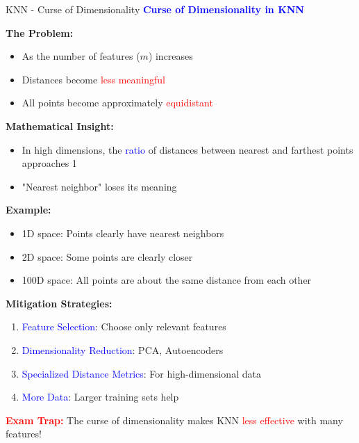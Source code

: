 \documentclass[8pt]{beamer}
\begin{document}
	\begin{frame}{KNN - Curse of Dimensionality}
		\fontsize{6.5}{7.5}\selectfont
		\textcolor{blue}{\textbf{Curse of Dimensionality in KNN}}
		
		\textbf{The Problem:}
		\begin{itemize}
			\item As the number of features ($m$) increases
			\item Distances become \textcolor{red}{less meaningful}
			\item All points become approximately \textcolor{red}{equidistant}
		\end{itemize}
		
		\textbf{Mathematical Insight:}
		\begin{itemize}
			\item In high dimensions, the \textcolor{blue}{ratio} of distances between nearest and farthest points approaches 1
			\item "Nearest neighbor" loses its meaning
		\end{itemize}
		
		\textbf{Example:}
		\begin{itemize}
			\item 1D space: Points clearly have nearest neighbors
			\item 2D space: Some points are clearly closer
			\item 100D space: All points are about the same distance from each other
		\end{itemize}
		
		\textbf{Mitigation Strategies:}
		\begin{enumerate}
			\item \textcolor{blue}{Feature Selection}: Choose only relevant features
			\item \textcolor{blue}{Dimensionality Reduction}: PCA, Autoencoders
			\item \textcolor{blue}{Specialized Distance Metrics}: For high-dimensional data
			\item \textcolor{blue}{More Data}: Larger training sets help
		\end{enumerate}
		
		\textcolor{red}{\textbf{Exam Trap:}} The curse of dimensionality makes KNN \textcolor{red}{less effective} with many features!
	\end{frame}
	
\end{document}
